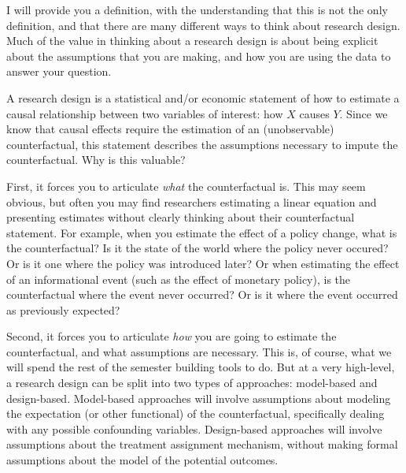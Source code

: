 \documentclass{tufte-handout}
\theoremstyle{break}
\begin{document}
I will provide you a definition, with the understanding that this is not the only definition, and that there are many different ways to think about research design. Much of the value in thinking about a research design is about being explicit about the assumptions that you are making, and how you are using the data to answer your question.

A research design is a statistical and/or economic statement of how to estimate a causal relationship between two variables of interest: how $X$ causes $Y$. Since we know that causal effects require the estimation of an (unobservable) counterfactual, this statement describes the assumptions necessary to impute the counterfactual. Why is this valuable?

First, it forces you to articulate \emph{what} the counterfactual is. This may seem obvious, but often you may find researchers estimating a linear equation and presenting estimates without clearly thinking about their counterfactual statement. For example, when you estimate the effect of a policy change, what is the counterfactual? Is it the state of the world where the policy never occured? Or is it one where the policy was introduced later? Or when estimating the effect of an informational event (such as the effect of monetary policy), is the counterfactual where the event never occurred? Or is it where the event occurred as previously expected?

Second, it forces you to articulate \emph{how} you are going to estimate the counterfactual, and what assumptions are necessary. This is, of course, what we will spend the rest of the semester building tools to do. But at a very high-level, a research design can be split into two types of approaches: model-based and design-based. Model-based approaches will involve assumptions about modeling the expectation (or other functional) of the counterfactual, specifically dealing with any possible confounding variables. Design-based approaches will involve assumptions about the treatment assignment mechanism, without making formal assumptions about the model of the potential outcomes.
\end{document}

